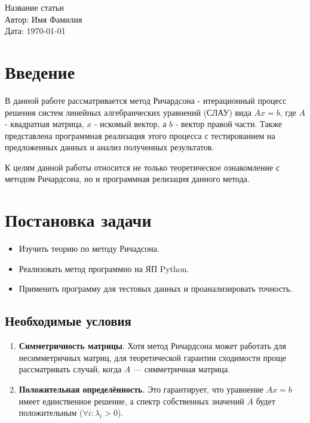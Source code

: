 \documentclass[a4paper,12pt]{article}
\begin{document}
	
	\begin{center}
		{\LARGE Название статьи} \\[1cm]
		{\large Автор: Имя Фамилия} \\[0.5cm]
		{\large Дата: \today}
	\end{center}
	
	\newpage
	
	\tableofcontents %
	\newpage

	
	\section*{Введение}
	
	В данной работе рассматривается метод Ричардсона - итерационный процесс решения систем линейных алгебраических уравнений (СЛАУ) вида $Ax = b$, где $A$ - квадратная матрица, $x$ - искомый вектор, а $b$ - вектор правой части. Также представлена программная реализация этого процесса с тестированием на предложенных данных и анализ полученных результатов.
	
	К целям данной работы относится не только теоретическое ознакомление с методом Ричардсона, но и программная релизация данного метода.
	
	\newpage
	
	\section{Постановка задачи}
	\begin{itemize}
		\item Изучить теорию по методу Ричадсона.
		\item Реализовать метод программно на ЯП Python.
		\item Применить программу для тестовых данных и проанализировать точность.
	\end{itemize}

	
	\subsection{Необходимые условия}
	\begin{enumerate}
		\item \textbf{Симметричность матрицы}. Хотя метод Ричардсона может работать для несимметричных матриц, для теоретической гарантии сходимости проще рассматривать случай, когда 
		$A$ — симметричная матрица.
		
		\item  \textbf{Положительная определённость}. Это гарантирует, что уравнение 
		$Ax=b$ имеет единственное решение, а спектр собственных значений $A$ будет положительным ($\forall i:\lambda_i > 0$).
	\end{enumerate}
	
\end{document}
